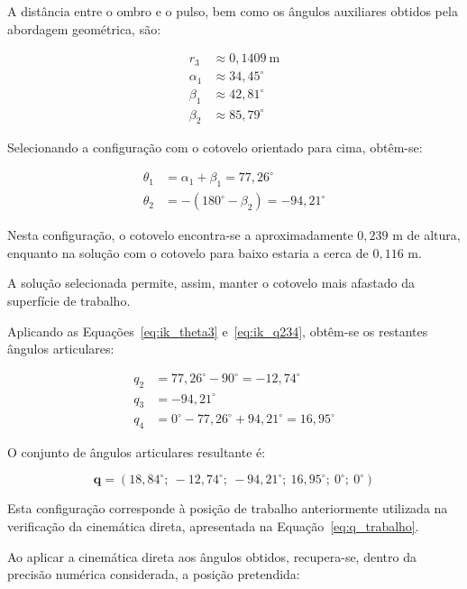 A distância entre o ombro e o pulso, bem como os ângulos auxiliares obtidos pela abordagem geométrica, são:

\begin{equation}
    \begin{aligned}
        r_3 &\approx0{,}1409\ \text{m}\\
        \alpha_1 &\approx34{,}45^\circ\\
        \beta_1 &\approx42{,}81^\circ\\
        \beta_2 &\approx85{,}79^\circ
    \end{aligned}
\end{equation}

Selecionando a configuração com o cotovelo orientado para cima, obtêm-se:

\begin{align}
    \theta_1 &= \alpha_1+\beta_1
    =77{,}26^\circ\\
    \theta_2 &= -(180^\circ-\beta_2)
    =-94{,}21^\circ
\end{align}

Nesta configuração, o cotovelo encontra-se a aproximadamente $0{,}239$ m de altura, enquanto na solução com o cotovelo para baixo estaria a cerca de $0{,}116$ m.

A solução selecionada permite, assim, manter o cotovelo mais afastado da superfície de trabalho.

Aplicando as Equações~\eqref{eq:ik_theta3} e~\eqref{eq:ik_q234}, obtêm-se os restantes ângulos articulares:

\begin{align*}
    q_2 &=77{,}26^\circ-90^\circ
    =-12{,}74^\circ\\
    q_3 &=-94{,}21^\circ\\
    q_4 &=0^\circ-77{,}26^\circ+94{,}21^\circ
    =16{,}95^\circ
\end{align*}

O conjunto de ângulos articulares resultante é:

\begin{equation}
    \boxed{
    \mathbf{q}=
    (18{,}84^\circ;\
    -12{,}74^\circ;\
    -94{,}21^\circ;\
    16{,}95^\circ;\
    0^\circ;\
    0^\circ)
    }
    \label{eq:ik_exemplo1}
\end{equation}

Esta configuração corresponde à posição de trabalho anteriormente utilizada na verificação da cinemática direta, apresentada na Equação~\eqref{eq:q_trabalho}.

Ao aplicar a cinemática direta aos ângulos obtidos, recupera-se, dentro da precisão numérica considerada, a posição pretendida:

